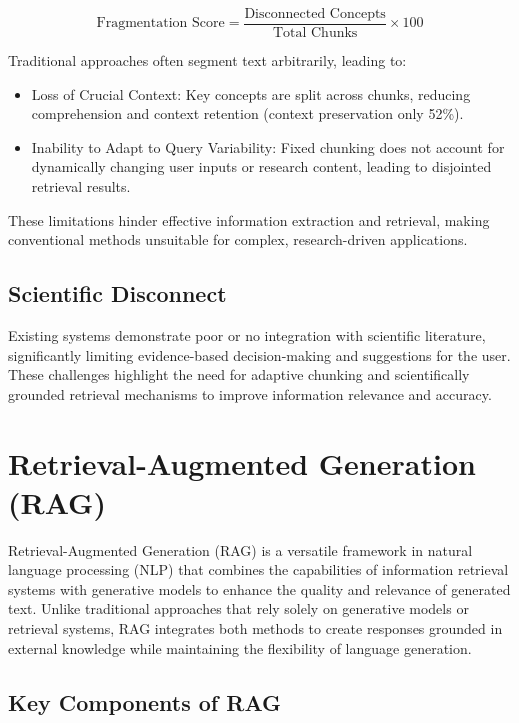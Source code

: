 \documentclass[conference]{IEEEtran}
\begin{document}
\begin{equation}  
\text{Fragmentation Score} = \frac{\text{Disconnected Concepts}}{\text{Total Chunks}} \times 100  
\end{equation}  

Traditional approaches often segment text arbitrarily, leading to:  

\begin{itemize}  
    \item Loss of Crucial Context: Key concepts are split across chunks, reducing comprehension and context retention (context preservation only 52\%).  
    \item Inability to Adapt to Query Variability: Fixed chunking does not account for dynamically changing user inputs or research content, leading to disjointed retrieval results.  
\end{itemize}  

These limitations hinder effective information extraction and retrieval, making conventional methods unsuitable for complex, research-driven applications.  

\subsection{Scientific Disconnect}
Existing systems demonstrate poor or no integration with scientific literature, significantly limiting evidence-based decision-making and suggestions for the user.\\

These challenges highlight the need for adaptive chunking and scientifically grounded retrieval mechanisms to improve information relevance and accuracy.  

\section{Retrieval-Augmented Generation (RAG)}

Retrieval-Augmented Generation (RAG) is a versatile framework in natural language processing (NLP) that combines the capabilities of information retrieval systems with generative models to enhance the quality and relevance of generated text. Unlike traditional approaches that rely solely on generative models or retrieval systems, RAG integrates both methods to create responses grounded in external knowledge while maintaining the flexibility of language generation.

\subsection{Key Components of RAG}
\end{document}
